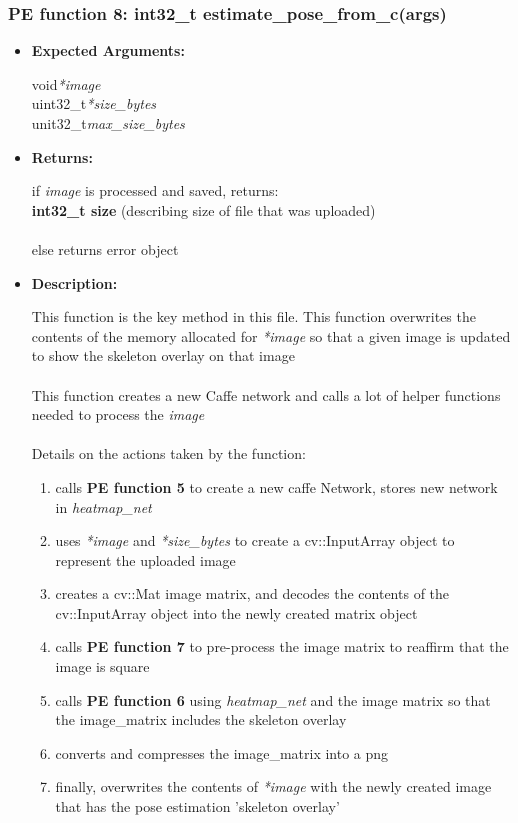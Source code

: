 \documentclass{scrreprt}
\begin{document}
\subsubsection{PE function 8: int32\_t estimate\_pose\_from\_c(args)}
\begin{itemize}
    \item \textbf{Expected Arguments:}

    void\quad\textit{*image}
    \\
    uint32\_t\quad\textit{*size\_bytes}
    \\
    unit32\_t\quad\textit{max\_size\_bytes}

    \item \textbf{Returns:}

    if \textit{image} is processed and saved, returns:\\\textbf{int32\_t size}
    (describing size of file that was uploaded)
    \\\\
    else returns error object

    \item \textbf{Description:}

    This function is the key method in this file. This function overwrites the contents of the memory allocated for \textit{*image} so that a given image is updated to show the skeleton overlay on that image
    \\\\
    This function creates a new Caffe network and calls a lot of helper functions needed to process the \textit{image}
    \\\\
    Details on the actions taken by the function:
    \begin{enumerate}
        \item calls \textbf{PE function 5} to create a new caffe Network, stores new network in \textit{heatmap\_net}

        \item uses \textit{*image} and \textit{*size\_bytes} to create a cv::InputArray object to represent the uploaded image

        \item creates a cv::Mat image matrix, and decodes the contents of the cv::InputArray object into the newly created matrix object

        \item calls \textbf{PE function 7} to pre-process the image matrix to reaffirm that the image is square

        \item calls \textbf{PE function 6} using \textit{heatmap\_net} and the image matrix so that the image\_matrix includes the skeleton overlay

        \item converts and compresses the image\_matrix into a png

        \item finally, overwrites the contents of \textit{*image} with the newly created image that has the pose estimation 'skeleton overlay'
    \end{enumerate}

\end{itemize}
\end{document}
